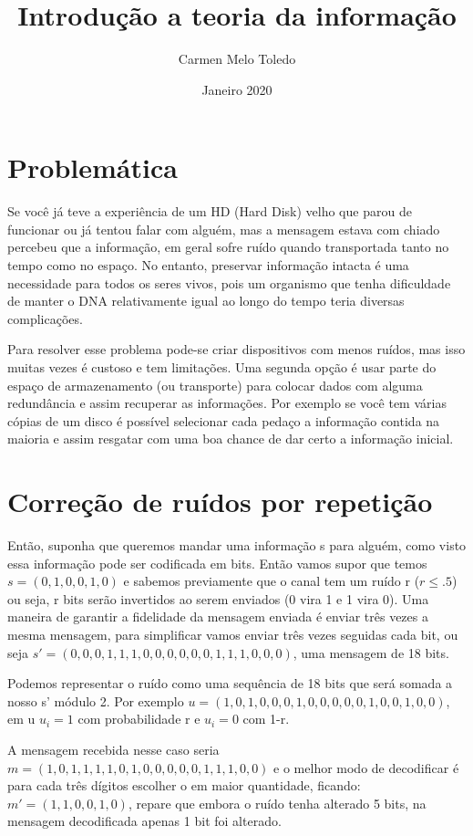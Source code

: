 \documentclass{article}
\title{Introdução a teoria da informação}
\author{Carmen Melo Toledo}
\date{Janeiro 2020}
\begin{document}
\maketitle

\section{Problemática}
Se você já teve a experiência de um HD (Hard Disk) velho que parou de funcionar ou já tentou falar com alguém, mas a mensagem estava com chiado percebeu que a informação, em geral sofre ruído quando transportada tanto no tempo como no espaço. No entanto, preservar informação intacta é uma necessidade para todos os seres vivos, pois um organismo que tenha dificuldade de manter o DNA relativamente igual ao longo do tempo teria diversas complicações.

Para resolver esse problema pode-se criar dispositivos com menos ruídos, mas isso muitas vezes é custoso e tem limitações. Uma segunda opção é usar parte do espaço de armazenamento (ou transporte) para colocar dados com alguma redundância e assim recuperar as informações. Por exemplo se você tem várias cópias de um disco é possível selecionar cada pedaço a informação contida na maioria e assim resgatar com uma boa chance de dar certo a informação inicial.

\section{Correção de ruídos por repetição}
Então, suponha que queremos mandar uma informação s para alguém, como visto essa informação pode ser codificada em bits. Então vamos supor que temos $s=(0,1,0,0,1,0)$ e sabemos previamente que o canal tem um ruído r ($r\leq.5$) ou seja, r bits serão invertidos ao serem enviados (0 vira 1 e 1 vira 0). Uma maneira de garantir a fidelidade da mensagem enviada é enviar três vezes a mesma mensagem, para simplificar vamos enviar três vezes seguidas cada bit, ou seja $s'=(0,0,0,1,1,1,0,0,0,0,0,0,1,1,1,0,0,0)$, uma mensagem de 18 bits.

Podemos representar o ruído como uma sequência de 18 bits que será somada a nosso s' módulo 2. Por exemplo $u=(1,0,1,0,0,0,1,0,0,0,0,0,1,0,0,1,0,0)$, em u $u_i=1$ com probabilidade r e $u_i=0$ com 1-r.

A mensagem recebida nesse caso seria $m=(1,0,1,1,1,1,0,1,0,0,0,0,0,1,1,1,0,0)$ e o melhor modo de decodificar é para cada três  dígitos escolher o em maior quantidade, ficando:
$m'=(1,1,0,0,1,0)$, repare que embora o ruído tenha alterado 5 bits, na mensagem decodificada apenas 1 bit foi alterado.
\end{document}
